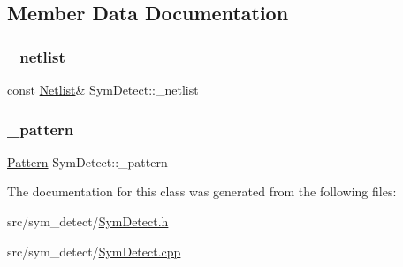 \subsection{Member Data Documentation}
\mbox{\label{classSymDetect_aaa007c5c446ad65879c91e258542c9f3}} 
\subsubsection{\texorpdfstring{\+\_\+netlist}{\_netlist}}
{\footnotesize\ttfamily const \hyperlink{classNetlist}{Netlist}\& Sym\+Detect\+::\+\_\+netlist\hspace{0.3cm}{\ttfamily [private]}}

\mbox{\label{classSymDetect_a77937a3591871874553ea30e7d78fc2e}} 
\subsubsection{\texorpdfstring{\+\_\+pattern}{\_pattern}}
{\footnotesize\ttfamily \hyperlink{classPattern}{Pattern} Sym\+Detect\+::\+\_\+pattern\hspace{0.3cm}{\ttfamily [private]}}



The documentation for this class was generated from the following files\+:\begin{DoxyCompactItemize}
\item 
src/sym\+\_\+detect/\hyperlink{SymDetect_8h}{Sym\+Detect.\+h}\item 
src/sym\+\_\+detect/\hyperlink{SymDetect_8cpp}{Sym\+Detect.\+cpp}\end{DoxyCompactItemize}
